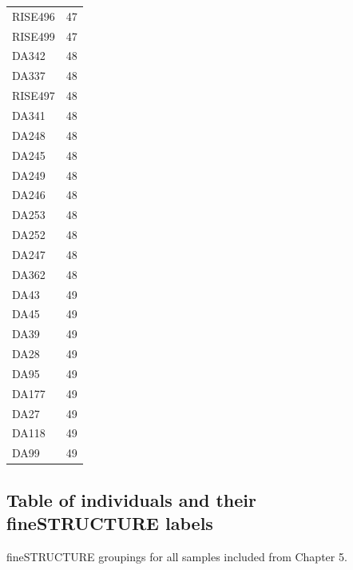 \begin{longtable}[t]{ll}
RISE496 & 47\\
RISE499 & 47\\
DA342 & 48\\
DA337 & 48\\
RISE497 & 48\\
DA341 & 48\\
DA248 & 48\\
DA245 & 48\\
DA249 & 48\\
DA246 & 48\\
DA253 & 48\\
DA252 & 48\\
DA247 & 48\\
DA362 & 48\\
DA43 & 49\\
DA45 & 49\\
DA39 & 49\\
DA28 & 49\\
DA95 & 49\\
DA177 & 49\\
DA27 & 49\\
DA118 & 49\\
DA99 & 49\\*
\end{longtable}
\endgroup{}



\subsection{Table of individuals and their fineSTRUCTURE labels} 
\label{sec:fs_slavs_group}

fineSTRUCTURE groupings for all samples included from Chapter 5.

\begingroup\fontsize{9}{11}\selectfont

